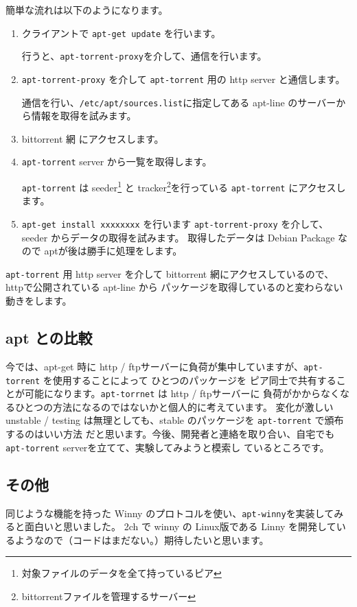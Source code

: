 \documentclass[mingoth,a4paper,twoside]{jsarticle}
\begin{document}
簡単な流れは以下のようになります。
\begin{enumerate}
	\item クライアントで \texttt{apt-get update} を行います。

		行うと、\texttt{apt-torrent-proxy}を介して、通信を行います。

	\item \texttt{apt-torrent-proxy} を介して \texttt{apt-torrent} 用の http server と通信します。

		通信を行い、\texttt{/etc/apt/sources.list}に指定してある apt-line のサーバーから情報を取得を試みます。
	\item bittorrent 網 にアクセスします。
	
	\item \texttt{apt-torrent} server から一覧を取得します。

		\texttt{apt-torrent} は seeder\footnote{対象ファイルのデータを全て持っているピア} と 
		tracker\footnote{bittorrentファイルを管理するサーバー}を行っている \texttt{apt-torrent} にアクセスします。
	
	\item \texttt{apt-get install xxxxxxxx} を行います
		\texttt{apt-torrent-proxy} を介して、seeder からデータの取得を試みます。
		取得したデータは Debian Package なので aptが後は勝手に処理をします。
 	
\end{enumerate}

\texttt{apt-torrent} 用 http server を介して bittorrent 網にアクセスしているので、httpで公開されている apt-line から
パッケージを取得しているのと変わらない動きをします。

\subsection{apt との比較}
	今では、apt-get 時に http / ftpサーバーに負荷が集中していますが、\texttt{apt-torrent} を使用することによって
	ひとつのパッケージを ピア同士で共有することが可能になります。\texttt{apt-torrnet} は http / ftpサーバーに
	負荷がかからなくなるひとつの方法になるのではないかと個人的に考えています。
	変化が激しい unstable / testing は無理としても、stable のパッケージを \texttt{apt-torrent} で頒布するのはいい方法
	だと思います。今後、開発者と連絡を取り合い、自宅でも \texttt{apt-torrent} serverを立てて、実験してみようと模索し
	ているところです。
	
\subsection{その他}
 同じような機能を持った Winny のプロトコルを使い、\texttt{apt-winny}を実装してみると面白いと思いました。
 2ch で winny の Linux版である Linny を開発しているようなので（コードはまだない。）期待したいと思います。
\end{document}
